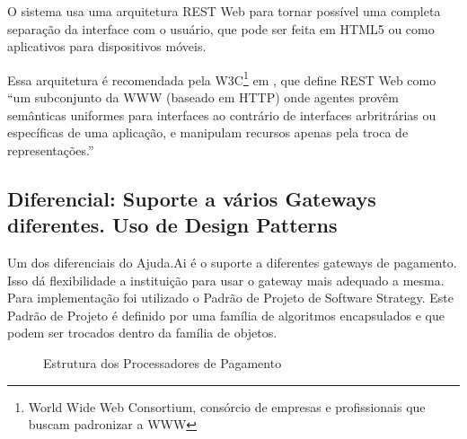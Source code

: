 O sistema usa uma arquitetura REST Web para tornar possível uma completa separação da interface com o usuário, que pode ser feita em HTML5 ou como aplicativos para dispositivos móveis.

Essa arquitetura é recomendada pela W3C\footnote{World Wide Web Consortium, consórcio de empresas e profissionais que buscam padronizar a WWW} em \cite{booth2004webservices}, que define REST Web como ``um subconjunto da WWW (baseado em HTTP) onde agentes provêm semânticas uniformes para interfaces ao contrário de interfaces arbritrárias ou específicas de uma aplicação, e manipulam recursos apenas pela troca de representações.''

\subsection{Diferencial: Suporte a vários Gateways diferentes. Uso de Design Patterns}

Um dos diferenciais do Ajuda.Ai é o suporte a diferentes gateways de pagamento. Isso dá flexibilidade a instituição para usar o gateway mais adequado a mesma. Para implementação foi utilizado o Padrão de Projeto de Software Strategy. Este Padrão de Projeto é definido por uma família de algoritmos encapsulados e que podem ser trocados dentro da família de objetos.

\begin{figure}[H]
	\caption{\label{fig_uml_strategy}Estrutura dos Processadores de Pagamento}
    \centering
\end{figure}

